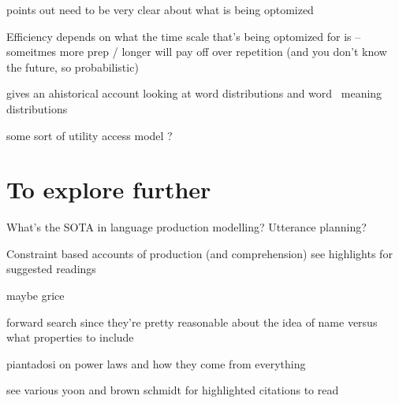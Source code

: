 \documentclass[]{article}
\begin{document}
points out need to be very clear about what is being optomized

Efficiency depends on what the time scale that's being optomized for is -- someitmes more prep / longer will pay off over repetition (and you don't know the future, so probabilistic)

gives an ahistorical account looking at word distributions and word \ meaning distributions 

some sort of utility access model ? 
\section{To explore further}

What's the SOTA in language production modelling? Utterance planning? 

Constraint based accounts of production (and comprehension) see \cite{hanna2003} highlights for suggested readings

maybe grice

forward search \cite{heller2012} since they're pretty reasonable about the idea of name versus what properties to include 

piantadosi on power laws and how they come from everything 

see various yoon and brown schmidt for highlighted citations to read 

\end{document}

